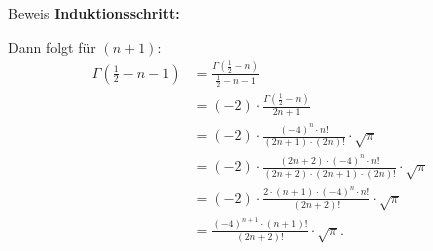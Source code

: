 \documentclass[10pt]{beamer}
\begin{document}
\begin{frame}{Beweis}
    \textbf{Induktionsschritt:}

    Dann folgt für \( \left( n + 1 \right) \):
    \begin{align*}
        \Gamma\left( \frac{1}{2} - n - 1  \right)
        & = \frac{\Gamma\left( \frac{1}{2} - n \right)}{\frac{1}{2} - n - 1} \\
        & = \left( - 2 \right) \cdot \frac{\Gamma\left( \frac{1}{2} - n \right)}{2n + 1} \\
        & = \left( - 2 \right) \cdot \frac{\left( - 4 \right)^{n} \cdot n!}{\left( 2n + 1 \right) \cdot \left( 2n \right)!} \cdot \sqrt{\pi} \\
        & = \left( - 2 \right) \cdot \frac{\left( 2n + 2 \right) \cdot \left( - 4 \right)^{n} \cdot n!}{\left( 2n + 2 \right) \cdot \left( 2n + 1 \right) \cdot \left( 2n \right)!} \cdot \sqrt{\pi} \\
        & = \left( - 2 \right) \cdot \frac{2 \cdot \left( n + 1 \right) \cdot \left( - 4 \right)^{n} \cdot n!}{\left( 2n + 2 \right)!} \cdot \sqrt{\pi} \\
        & = \frac{\left( - 4 \right)^{n + 1} \cdot \left( n + 1 \right)!}{\left( 2n + 2 \right)!} \cdot \sqrt{\pi}.
    \end{align*}
\end{frame}
\end{document}
